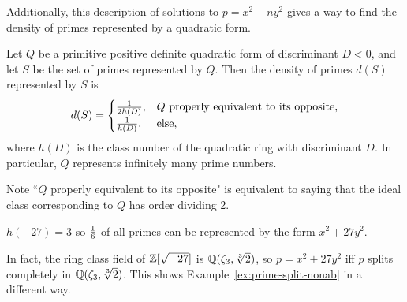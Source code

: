 Additionally, this description of solutions to $p=x^2+ny^2$ gives a way to find the density of primes represented by a quadratic form.
\begin{thm}
Let $Q$ be a primitive positive definite quadratic form of discriminant $D<0$, and let $S$ be the set of primes represented by $Q$. Then the density of primes $d(S)$ represented by $S$ is
\[
d(S)=\begin{cases}
\frac{1}{2h(D)},& Q\text{ properly equivalent to its opposite,}\\
\frac{1}{h(D)},&\text{else},
\end{cases}
\]
where $h(D)$ is the class number of the quadratic ring with discriminant $D$. 
In particular, $Q$ represents infinitely many prime numbers.
\end{thm}
Note ``$Q$ properly equivalent to its opposite" is equivalent to saying that the ideal class corresponding to $Q$ has order dividing 2.
\begin{ex}
%
$h(-27)=3$ so $\frac{1}{6}$ of all primes can be represented by the form $x^2+27y^2$.

In fact, the ring class field of $\mathbb{Z}[\sqrt{-27}]$ is $\mathbb{Q}(\zeta_3,\sqrt[3]2)$, so $p=x^2+27y^2$ iff $p$ splits completely in $\mathbb{Q}(\zeta_3,\sqrt[3]2)$. This shows Example~\ref{ex:prime-split-nonab} in a different way.
\end{ex}
